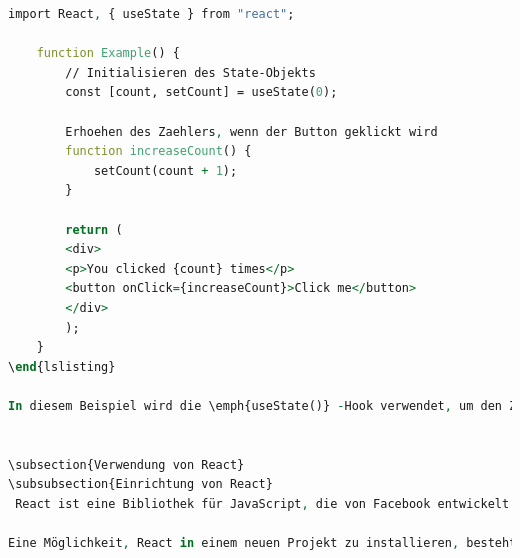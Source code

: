 \begin{lstlisting}[language=vhdl,
	frame=single,           % Ein Rahmen um den Code
	framexleftmargin=15pt,  % Rahmen link von den Zahlen
	style=algoBericht,
	label={Dockerfile},
	captionpos=b           % Caption unter den Code setzen
	caption={.env für DHBW-Star}]
	import React, { useState } from "react";
	
	function Example() {
		// Initialisieren des State-Objekts
		const [count, setCount] = useState(0);
		
		Erhoehen des Zaehlers, wenn der Button geklickt wird
		function increaseCount() {
			setCount(count + 1);
		}
		
		return (
		<div>
		<p>You clicked {count} times</p>
		<button onClick={increaseCount}>Click me</button>
		</div>
		);
	}
\end{lslisting}

In diesem Beispiel wird die \emph{useState()} -Hook verwendet, um den Zustand der Komponente zu initialisieren. Die Funktion \emph{useState()} gibt ein Array zurück, das den aktuellen Zustand und eine Funktion zur Aktualisierung des Zustands enthält. In diesem Fall wird der Zustand mit \emph{count} initialisiert und die Funktion \emph{setCount()} wird verwendet, um den Zustand zu aktualisieren. Wenn der Button geklickt wird, wird die \emph{increaseCount()} Funktion aufgerufen, die den Zähler erhöht und den Zustand mithilfe von \emph{setCount()} aktualisiert. Die Änderung des Zustands löst eine erneute Ausführung der Komponente aus, und die aktualisierten Werte werden in der Benutzeroberfläche angezeigt.


\subsection{Verwendung von React}
\subsubsection{Einrichtung von React}
 React ist eine Bibliothek für JavaScript, die von Facebook entwickelt wurde und zur Erstellung von Benutzeroberflächen eingesetzt wird. Um React in einem Projekt verwenden zu können, muss es zuerst eingerichtet werden. Die offizielle Dokumentation von React bietet eine ausführliche Anleitung zur Einrichtung von React \cite{ReactDocsSetup}.

Eine Möglichkeit, React in einem neuen Projekt zu installieren, besteht darin, ein neues Projektverzeichnis zu erstellen und dann das React-Paket über NPM zu installieren:


\end{lstlisting}
